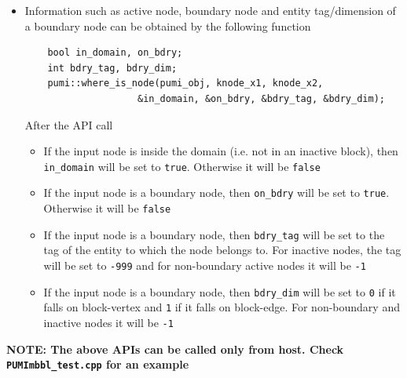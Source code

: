 \documentclass[a4paper,12pt]{article}
\begin{document}
\begin{itemize}
	\item Information such as active node, boundary node and entity tag/dimension of a boundary node can be obtained by the following function
	\begin{verbatim}
	bool in_domain, on_bdry;
	int bdry_tag, bdry_dim;
	pumi::where_is_node(pumi_obj, knode_x1, knode_x2, 
	                &in_domain, &on_bdry, &bdry_tag, &bdry_dim);
	\end{verbatim}
	After the API call
	\begin{itemize}
		\item If the input node is inside the domain (i.e. not in an inactive block), then \texttt{in\_domain} will be set to \texttt{true}. Otherwise it will be \texttt{false}
		\item If the input node is a boundary node, then \texttt{on\_bdry} will be set to \texttt{true}. Otherwise it will be \texttt{false}
		\item If the input node is a boundary node, then \texttt{bdry\_tag} will be set to the tag of the entity to which the node belongs to. For inactive nodes, the tag will be set to \texttt{-999} and for non-boundary active nodes it will be \texttt{-1}
		\item If the input node is a boundary node, then \texttt{bdry\_dim} will be set to \texttt{0} if it falls on block-vertex and \texttt{1} if it falls on block-edge. For non-boundary and inactive nodes it will be \texttt{-1} 
	\end{itemize}
	 
	
\end{itemize}
\textbf{NOTE: The above APIs can be called only from host. Check \texttt{PUMImbbl\_test.cpp} for an example}
\end{document}
